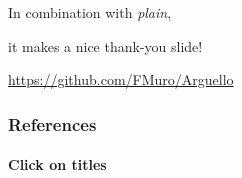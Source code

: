\documentclass{beamer}
\begin{document}
\ThankYou
\begin{frame}
      In combination with \textit{plain},\par
      it makes a nice thank-you slide!
      \vfill\scalebox{4}{\faGithub}\par\bigskip
      \url{https://github.com/FMuro/Arguello}
\end{frame}

\begin{frame}[allowframebreaks]
      \frametitle{References}
      \framesubtitle{Click on titles}
      \nocite{*}
      \printbibliography[heading=none]
\end{frame}
\end{document}
